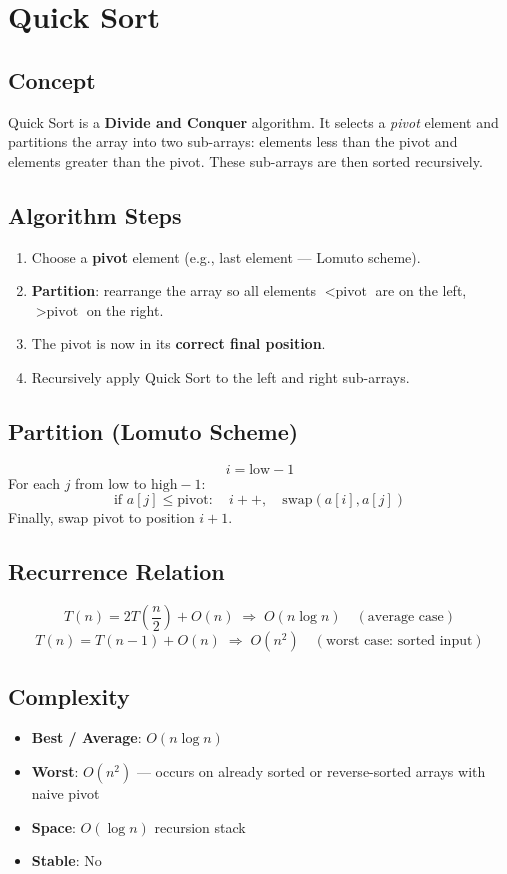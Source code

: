 \documentclass[12pt,a4paper]{article}
\begin{document}
\newpage

\section{Quick Sort}

\subsection{Concept}
Quick Sort is a \textbf{Divide and Conquer} algorithm. It selects a \textit{pivot} element and partitions the array into two sub-arrays: elements less than the pivot and elements greater than the pivot. These sub-arrays are then sorted recursively.

\subsection{Algorithm Steps}
\begin{enumerate}
    \item Choose a \textbf{pivot} element (e.g., last element — Lomuto scheme).
    \item \textbf{Partition}: rearrange the array so all elements $< \text{pivot}$ are on the left, $> \text{pivot}$ on the right.
    \item The pivot is now in its \textbf{correct final position}.
    \item Recursively apply Quick Sort to the left and right sub-arrays.
\end{enumerate}

\subsection{Partition (Lomuto Scheme)}
\[
i = \text{low} - 1
\]
For each $j$ from $\text{low}$ to $\text{high}-1$:
\[
\text{if } a[j] \le \text{pivot}: \quad i{+}{+}, \quad \text{swap}(a[i], a[j])
\]
Finally, swap pivot to position $i+1$.

\subsection{Recurrence Relation}
\[
T(n) = 2T\!\left(\frac{n}{2}\right) + O(n) \;\Rightarrow\; O(n \log n) \quad (\text{average case})
\]
\[
T(n) = T(n-1) + O(n) \;\Rightarrow\; O(n^2) \quad (\text{worst case: sorted input})
\]

\subsection{Complexity}
\begin{itemize}
    \item \textbf{Best / Average}: $O(n \log n)$
    \item \textbf{Worst}: $O(n^2)$ — occurs on already sorted or reverse-sorted arrays with naive pivot
    \item \textbf{Space}: $O(\log n)$ recursion stack
    \item \textbf{Stable}: No
\end{itemize}
\end{document}
